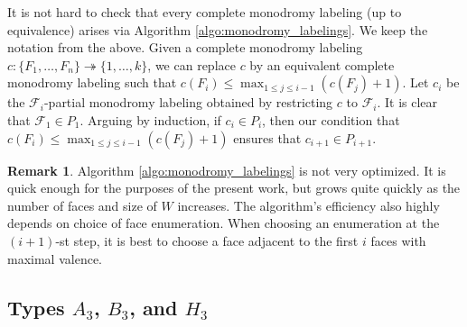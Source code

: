 \documentclass{amsart}
\newcommand{\scrF}{\mathcal{F}}
\theoremstyle{definition}
\newtheorem{remark}[subsubsection]{Remark}
\numberwithin{equation}{subsection}
\begin{document}
It is not hard to check that every complete monodromy labeling (up to equivalence) arises via Algorithm \ref{algo:monodromy_labelings}. 
We keep the notation from the above.
Given a complete monodromy labeling $c : \{F_1, \ldots, F_n\} \twoheadrightarrow \{1, \ldots, k\}$, we can replace $c$ by an equivalent complete monodromy labeling such that $c (F_i) \leq \max_{1 \leq j \leq i-1} (c (F_j) + 1)$.
Let $c_i$ be the $\scrF_i$-partial monodromy labeling obtained by restricting $c$ to $\scrF_i$.
It is clear that $\scrF_1 \in P_1$. Arguing by induction, if $c_i \in P_i$, then our condition that $c (F_i) \leq \max_{1 \leq j \leq i-1} (c (F_j) + 1)$ ensures that $c_{i+1} \in P_{i+1}$.

\begin{remark}
    Algorithm \ref{algo:monodromy_labelings} is not very optimized. It is quick enough for the purposes of the present work, but grows quite quickly as the number of faces and size of $W$ increases.
    The algorithm's efficiency also highly depends on choice of face enumeration. When choosing an enumeration at the $(i+1)$-st step, it is best to choose a face adjacent to the first $i$ faces with maximal valence.
\end{remark}

\subsection{Types \texorpdfstring{$A_3$}{A3}, \texorpdfstring{$B_3$}{B3}, and \texorpdfstring{$H_3$}{H3}}
\end{document}
